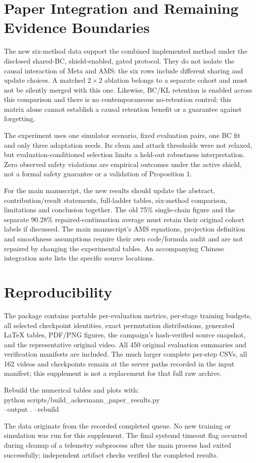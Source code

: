 \documentclass[lettersize,journal]{IEEEtran}
\begin{document}
\section{Paper Integration and Remaining Evidence Boundaries}
The new six-method data support the combined implemented method under the disclosed shared-BC, shield-enabled, gated protocol. They do not isolate the causal interaction of Meta and AMS: the six rows include different sharing and update choices. A matched $2\times2$ ablation belongs to a separate cohort and must not be silently merged with this one. Likewise, BC/KL retention is enabled across this comparison and there is no contemporaneous no-retention control; this matrix alone cannot establish a causal retention benefit or a guarantee against forgetting.

The experiment uses one simulator scenario, fixed evaluation pairs, one BC fit and only three adaptation seeds. Its clean and attack thresholds were not relaxed, but evaluation-conditioned selection limits a held-out robustness interpretation. Zero observed safety violations are empirical outcomes under the active shield, not a formal safety guarantee or a validation of Proposition 1.

For the main manuscript, the new results should update the abstract, contribution/result statements, full-ladder tables, six-method comparison, limitations and conclusion together. The old 75\% single-chain figure and the separate 90.28\% repaired-continuation average must retain their original cohort labels if discussed. The main manuscript's AMS equations, projection definition and smoothness assumptions require their own code/formula audit and are not repaired by changing the experimental tables. An accompanying Chinese integration note lists the specific source locations.

\section{Reproducibility}
The package contains portable per-evaluation metrics, per-stage training budgets, all selected checkpoint identities, exact permutation distributions, generated LaTeX tables, PDF/PNG figures, the campaign's hash-verified source snapshot, and the representative original video. All 450 original evaluation summaries and verification manifests are included. The much larger complete per-step CSVs, all 162 videos and checkpoints remain at the server paths recorded in the input manifest; this supplement is not a replacement for that full raw archive.

\noindent Rebuild the numerical tables and plots with:\\
{\footnotesize\ttfamily python scripts/build\_ackermann\_paper\_results.py\\
--output . --rebuild}

The data originate from the recorded completed queue. No new training or simulation was run for this supplement. The final systemd timeout flag occurred during cleanup of a telemetry subprocess after the main process had exited successfully; independent artifact checks verified the completed results.



\end{document}
